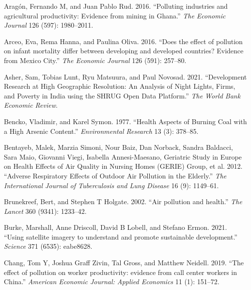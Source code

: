 \documentclass[
]{article}
\newlength{\cslhangindent}
\newlength{\cslentryspacingunit} %
\newenvironment{CSLReferences}[2] %
 {%
  \setlength{\parindent}{0pt}
  \ifodd #1
  \let\oldpar\par
  \def\par{\hangindent=\cslhangindent\oldpar}
  \fi
  \setlength{\parskip}{#2\cslentryspacingunit}
 }%
 {}
\begin{document}
\hypertarget{refs}{}
\begin{CSLReferences}{1}{0}
\leavevmode{}%
Aragón, Fernando M, and Juan Pablo Rud. 2016. {``{Polluting industries and agricultural productivity: Evidence from mining in Ghana}.''} \emph{{The Economic Journal}} 126 (597): 1980--2011.

\leavevmode{}%
Arceo, Eva, Rema Hanna, and Paulina Oliva. 2016. {``{Does the effect of pollution on infant mortality differ between developing and developed countries? Evidence from Mexico City}.''} \emph{{The Economic Journal}} 126 (591): 257--80.

\leavevmode{}%
Asher, Sam, Tobias Lunt, Ryu Matsuura, and Paul Novosad. 2021. {``{Development Research at High Geographic Resolution: An Analysis of Night Lights, Firms, and Poverty in India using the SHRUG Open Data Platform}.''} \emph{{The World Bank Economic Review}}.

\leavevmode{}%
Bencko, Vladimir, and Karel Symon. 1977. {``Health Aspects of Burning Coal with a High Arsenic Content.''} \emph{{Environmental Research}} 13 (3): 378--85.

\leavevmode{}%
Bentayeb, Malek, Marzia Simoni, Nour Baiz, Dan Norback, Sandra Baldacci, Sara Maio, Giovanni Viegi, Isabella Annesi-Maesano, Geriatric Study in Europe on Health Effects of Air Quality in Nursing Homes (GERIE) Group, et al. 2012. {``Adverse Respiratory Effects of Outdoor Air Pollution in the Elderly.''} \emph{{The International Journal of Tuberculosis and Lung Disease}} 16 (9): 1149--61.

\leavevmode{}%
Brunekreef, Bert, and Stephen T Holgate. 2002. {``{Air pollution and health}.''} \emph{{The Lancet}} 360 (9341): 1233--42.

\leavevmode{}%
Burke, Marshall, Anne Driscoll, David B Lobell, and Stefano Ermon. 2021. {``{Using satellite imagery to understand and promote sustainable development}.''} \emph{Science} 371 (6535): eabe8628.

\leavevmode{}%
Chang, Tom Y, Joshua Graff Zivin, Tal Gross, and Matthew Neidell. 2019. {``{The effect of pollution on worker productivity: evidence from call center workers in China}.''} \emph{{American Economic Journal: Applied Economics}} 11 (1): 151--72.


\end{CSLReferences}
\end{document}
